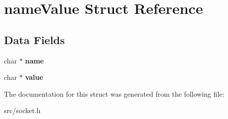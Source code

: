 \hypertarget{structnameValue}{
\section{nameValue Struct Reference}
\label{structnameValue}
}
\subsection*{Data Fields}
\begin{DoxyCompactItemize}
\item 
\hypertarget{structnameValue_ac3d2c6752f76d0cc0f73c9af3dda4ed6}{
char $\ast$ {\bfseries name}}
\label{structnameValue_ac3d2c6752f76d0cc0f73c9af3dda4ed6}

\item 
\hypertarget{structnameValue_a926a0523281bb4ec2ad7acd24b28f8d9}{
char $\ast$ {\bfseries value}}
\label{structnameValue_a926a0523281bb4ec2ad7acd24b28f8d9}

\end{DoxyCompactItemize}


The documentation for this struct was generated from the following file:\begin{DoxyCompactItemize}
\item 
src/socket.h\end{DoxyCompactItemize}

